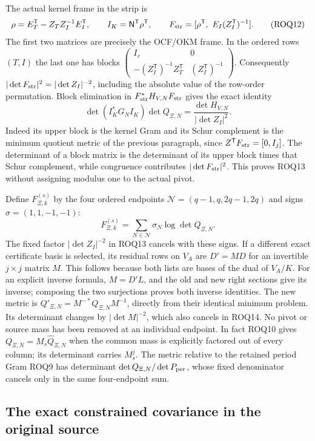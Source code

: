 \documentclass[11pt,a4paper]{article}
\begin{document}
The actual kernel frame in the strip is
\[
 \rho=E_T^{\mathsf T}-Z_T Z_I^{-1}E_I^{\mathsf T},\qquad
 I_K=\mathsf N^{\mathsf T}\rho^{\mathsf T},\qquad
 F_{\rm str}=[\rho^{\mathsf T},\ E_I(Z_I^{\mathsf T})^{-1}].
 \tag{ROQ12}
\]
The first two matrices are precisely the OCF/OKM frame. In the ordered
rows $(T,I)$ the last one has blocks
$\left(\begin{smallmatrix}I_r&0\\
 -(Z_I^{\mathsf T})^{-1}Z_T^{\mathsf T}&(Z_I^{\mathsf T})^{-1}
 \end{smallmatrix}\right)$.
Consequently $|\det F_{\rm str}|^2=|\det Z_I|^{-2}$, including the
absolute value of the row-order permutation. Block elimination in
$F_{\rm str}^*H_{V,N}F_{\rm str}$ gives the exact identity
\[
 \det(I_K^*G_NI_K)\det Q_{\Xi,N}
                 =\frac{\det H_{V,N}}{|\det Z_I|^2}.
 \tag{ROQ13}
\]
Indeed its upper block is the kernel Gram and its Schur complement
is the minimum quotient metric of the previous paragraph, since
$Z^{\mathsf T}F_{\rm str}=[0,I_j]$. The determinant of a block
matrix is the determinant of its upper block times that Schur
complement, while congruence contributes $|\det F_{\rm str}|^2$.
This proves ROQ13 without assigning modulus one to the actual pivot.

Define $F_{\Xi,k}^{(s)}$ by the four ordered endpoints
$\mathcal N=(q-1,q,2q-1,2q)$ and signs $\sigma=(1,1,-1,-1)$:
\[
 F_{\Xi,k}^{(s)}=\sum_{N\in\mathcal N}\sigma_N\log\det Q_{\Xi,N}.
 \tag{ROQ14}
\]
The fixed factor $|\det Z_I|^{-2}$ in ROQ13 cancels with these signs.
If a different exact certificate basis is selected, its residual rows
on $V_A$ are $D'=MD$ for an invertible $j\times j$ matrix $M$.
This follows because both lists are bases of the dual of $V_A/K$.
For an explicit inverse formula, $M=D'L$, and the old and new right
sections give its inverse; composing the two surjections proves both
inverse identities. The new metric is
$Q'_{\Xi,N}=M^{-*}Q_{\Xi,N}M^{-1}$, directly from their identical
minimum problem. Its determinant changes by $|\det M|^{-2}$, which
also cancels in ROQ14. No pivot or source mass has been removed at
an individual endpoint. In fact ROQ10 gives $Q_{\Xi,N}=M_s\widehat Q_{\Xi,N}$
when the common mass is explicitly factored out of every column;
its determinant carries $M_s^j$. The metric relative to the retained
period Gram ROQ9 has determinant $\det Q_{\Xi,N}/\det P_{\rm per}$,
whose fixed denominator cancels only in the same four-endpoint sum.

\subsection{The exact constrained covariance in the original source}
\end{document}
